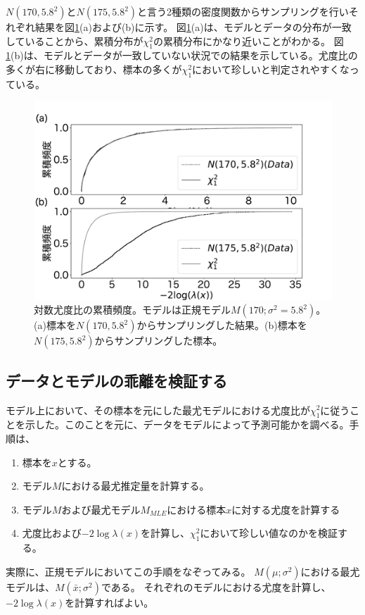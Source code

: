$N(170,5.8^2)$と$N(175,5.8^2)$と言う2種類の密度関数からサンプリングを行いそれぞれ結果を図\ref{fig:loglikelihood_test_simulation_norm}(a)および(b)に示す。
図\ref{fig:loglikelihood_test_simulation_norm}(a)は、モデルとデータの分布が一致していることから、累積分布が$\chi^2_1$の累積分布にかなり近いことがわかる。
図\ref{fig:loglikelihood_test_simulation_norm}(b)は、モデルとデータが一致していない状況での結果を示している。尤度比の多くが右に移動しており、標本の多くが$\chi^2_1$において珍しいと判定されやすくなっている。


\begin{figure}
    \begin{center}
        \includegraphics[width=15cm]{./image/04_/loglikeli_norm_test.pdf}
        \caption{対数尤度比の累積頻度。モデルは正規モデル$M(170;\sigma^2=5.8^2)$。(a)標本を$N(170,5.8^2)$からサンプリングした結果。(b)標本を$N(175,5.8^2)$からサンプリングした標本。}
        \label{fig:loglikelihood_test_simulation_norm}

      \end{center}
    \end{figure}

\subsection{データとモデルの乖離を検証する}
モデル上において、その標本を元にした最尤モデルにおける尤度比が$\chi^2_1$に従うことを示した。このことを元に、データをモデルによって予測可能かを調べる。手順は、
\begin{enumerate}
    \item 標本を$x$とする。
    \item モデル$M$における最尤推定量を計算する。
    \item モデル$M$および最尤モデル$M_{MLE}$における標本$x$に対する尤度を計算する
    \item 尤度比および$-2\log\lambda(x)$を計算し、$\chi^2_1$において珍しい値なのかを検証する。
\end{enumerate}
実際に、正規モデルにおいてこの手順をなぞってみる。
$M(\mu;\sigma^2)$における最尤モデルは、$M(\bar{x};\sigma^2)$である。
それぞれのモデルにおける尤度を計算し、$-2\log\lambda(x)$を計算すればよい。

